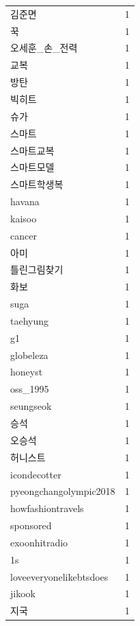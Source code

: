 \begin{tabular}{lr}
김준면 & 1 \\
꾹 & 1 \\
오세훈\_손\_전력 & 1 \\
교복 & 1 \\
방탄 & 1 \\
빅히트 & 1 \\
슈가 & 1 \\
스마트 & 1 \\
스마트교복 & 1 \\
스마트모델 & 1 \\
스마트학생복 & 1 \\
havana & 1 \\
kaisoo & 1 \\
cancer & 1 \\
아미 & 1 \\
틀린그림찾기 & 1 \\
화보 & 1 \\
suga & 1 \\
taehyung & 1 \\
g1 & 1 \\
globeleza & 1 \\
honeyst & 1 \\
oss\_1995 & 1 \\
seungseok & 1 \\
승석 & 1 \\
오승석 & 1 \\
허니스트 & 1 \\
icondecotter & 1 \\
pyeongchangolympic2018 & 1 \\
howfashiontravels & 1 \\
sponsored & 1 \\
exoonhitradio & 1 \\
1s & 1 \\
loveeveryonelikebtsdoes & 1 \\
jikook & 1 \\
지국 & 1 \\
\bottomrule
\end{tabular}
